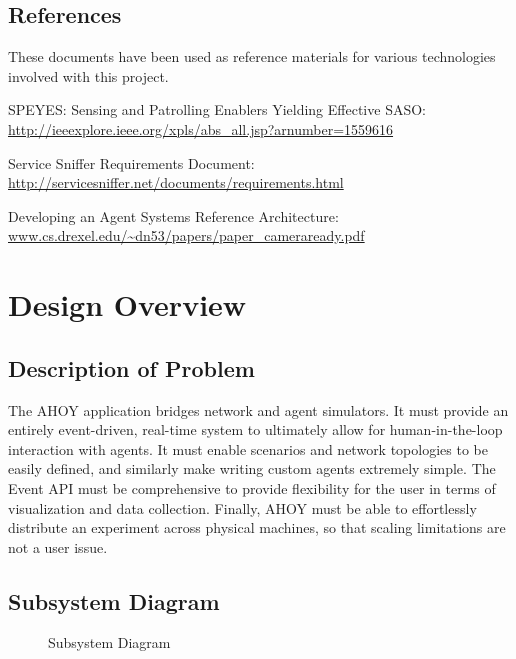 \documentclass[titlepage]{article}
\renewenvironment{itemize*}%
    {\begin{itemize}%
        \setlength{\itemsep}{0pt}%
        \setlength{\parskip}{0pt}%
        \setlength{\partopsep}{0pt}%
        \setlength{\topsep}{0pt}}%
    {\end{itemize}}
\begin{document}
\subsection{References%
  \label{references}%
}

These documents have been used as reference materials for various technologies involved with this project.
%
\begin{itemize*}
	\item SPEYES: Sensing and Patrolling Enablers Yielding Effective SASO: \url{http://ieeexplore.ieee.org/xpls/abs_all.jsp?arnumber=1559616}
	\item Service Sniffer Requirements Document: \url{http://servicesniffer.net/documents/requirements.html}
    \item Developing an Agent Systems Reference Architecture: \url{www.cs.drexel.edu/~dn53/papers/paper_cameraready.pdf}
\end{itemize*}

\section{Design Overview}
\subsection{Description of Problem}
The AHOY application bridges network and agent simulators. It must provide an entirely event-driven, real-time system to ultimately allow for human-in-the-loop interaction with agents. It must enable scenarios and network topologies to be easily defined, and similarly make writing custom agents extremely simple. The Event API must be comprehensive to provide flexibility for the user in terms of visualization and data collection. Finally, AHOY must be able to effortlessly distribute an experiment across physical machines, so that scaling limitations are not a user issue.

\subsection{Subsystem Diagram}
\begin{figure}%
    \centering
    \caption{Subsystem Diagram}
    \label{fig-subsystem}
\end{figure}
\end{document}
